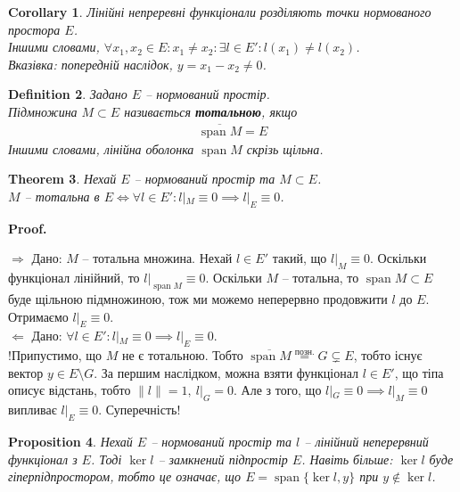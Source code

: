 \documentclass[a4paper, 10pt]{article}
\makeatletter
\def\rightproof{$\boxed{\Rightarrow}$ }
\def\leftproof{$\boxed{\Leftarrow}$ }
\theoremstyle{theoremdd}
\newtheorem{theorem}{Theorem}[subsection]
\theoremstyle{theoremdd}
\newtheorem{definition}[theorem]{Definition}
\theoremstyle{theoremdd}
\theoremstyle{theoremdd}
\theoremstyle{theoremdd}
\newtheorem{proposition}[theorem]{Proposition}
\theoremstyle{theoremdd}
\theoremstyle{theoremdd}
\theoremstyle{theoremdd}
\newtheorem{corollary}[theorem]{Corollary}
\renewenvironment{proof}[1][Proof.\\]{\par
\pushQED{\hfill \qed}%
\normalfont \topsep6\p@\@plus6\p@\relax
\trivlist
\item\relax
{\bfseries
#1\@addpunct{.}}\hspace\labelsep\ignorespaces
}{%
\popQED\endtrivlist\@endpefalse
}
\DeclareMathOperator{\linspan}{span}
\makeatother
\begin{document}
\begin{corollary}
Лінійні непреревні функціонали розділяють точки нормованого простора $E$.\\
Іншими словами, $\forall x_1,x_2 \in E: x_1 \neq x_2: \exists l \in E': l(x_1) \neq l(x_2)$.\\
\textit{Вказівка: попередній наслідок, $y = x_1 - x_2 \neq 0$.}
\end{corollary}

\begin{definition}
Задано $E$ -- нормований простір.\\
Підмножина $M \subset E$ називається \textbf{тотальною}, якщо
\begin{align*}
\overline{\linspan{M}} = E
\end{align*}
Іншими словами, лінійна оболонка $\linspan M$ скрізь щільна.
\end{definition}

\begin{theorem}
Нехай $E$ -- нормований простір та $M \subset E$.\\
$M$ -- тотальна в $E \iff \forall l \in E': l|_M \equiv 0 \implies l|_E \equiv 0$.
\end{theorem}

\begin{proof}
\rightproof Дано: $M$ -- тотальна множина. Нехай $l \in E'$ такий, що $l|_M \equiv 0$. Оскільки функціонал лінійний, то $l|_{\linspan M} \equiv 0$. Оскільки $M$ -- тотальна, то $\linspan M \subset E$ буде щільною підмножиною, тож ми можемо неперервно продовжити $l$ до $E$. Отримаємо $l|_E \equiv 0$.
\bigskip \\
\leftproof Дано: $\forall l \in E': l|_M \equiv 0 \implies l|_E \equiv 0$.\\
!Припустимо, що $M$ не є тотальною. Тобто $\overline{\linspan{M}} \overset{\text{позн.}}{=} G \subsetneq E$, тобто існує вектор $y \in E \setminus G$. За першим наслідком, можна взяти функціонал $l \in E'$, що тіпа описує відстань, тобто $\|l\| = 1,\ l|_G = 0$. Але з того, що $l|_G \equiv 0 \implies l|_M \equiv 0$ випливає $l|_E \equiv 0$. Суперечність!
\end{proof}

\begin{proposition}
\label{kernel_as_subspace}
Нехай $E$ -- нормований простір та $l$ -- лінійний неперервний функціонал з $E$. Тоді $\ker l$ -- замкнений підпростір $E$. Навіть більше: $\ker l$ буде гіперпідпростором, тобто це означає, що $E = \linspan\{\ker l, y\}$ при $y \notin \ker l$.
\end{proposition}
\end{document}
